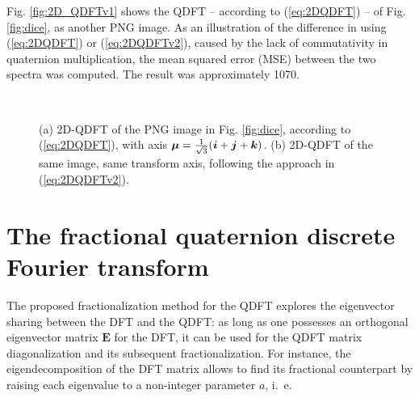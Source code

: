 Fig. \ref{fig:2D_QDFTv1} shows the QDFT -- according to (\ref{eq:2DQDFT}) -- of Fig. \ref{fig:dice}, as another PNG image. As an illustration of the difference in using (\ref{eq:2DQDFT}) or (\ref{eq:2DQDFTv2}), caused by the lack of commutativity in quaternion multiplication, the mean squared error (MSE) between the two spectra was computed. The result was approximately 1070. %



\begin{figure}
\centering
{}~
\caption{(a) 2D-QDFT of the PNG image in Fig. \ref{fig:dice}, according to (\ref{eq:2DQDFT}), with axis $ \boldsymbol{\mu} = \frac{1}{\sqrt{3}}(\boldsymbol{i} + \boldsymbol{j} + \boldsymbol{k}) $. (b) 2D-QDFT of the same image, same transform axis, following the approach in (\ref{eq:2DQDFTv2}).}
\label{fig:QDFT}
\end{figure}

\section{The fractional quaternion discrete Fourier transform}
\label{sec:FrQDFT}
The proposed fractionalization method for the QDFT explores the eigenvector sharing between the DFT and the QDFT: as long as one possesses an orthogonal eigenvector matrix $ \mathbf{E} $ for the DFT, it can be used for the QDFT matrix diagonalization and its subsequent fractionalization. For instance, the eigendecomposition of the DFT matrix allows to find its fractional counterpart by raising each eigenvalue to a non-integer parameter $ a $, i.~e.

